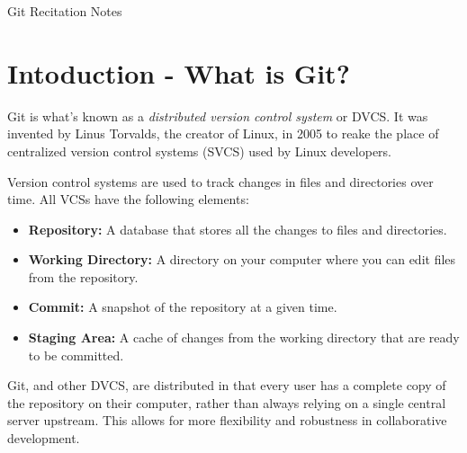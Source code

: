\documentclass[fleqn]{article}
\begin{document}
\begin{center}\LARGE Git Recitation Notes \end{center}

\section*{Intoduction - What is Git?}
Git is what's known as a \textit{distributed version control system} or DVCS.
It was invented by Linus Torvalds, the creator of Linux, in 2005 to reake the
place of centralized version control systems (SVCS) used by Linux developers.

Version control systems are used to track changes in files and directories over
time. All VCSs have the following elements:

\begin{itemize}
    \item \textbf{Repository:} A database that stores all the changes to files
                               and directories.
    \item \textbf{Working Directory:} A directory on your computer where you can
                                      edit files from the repository.
    \item \textbf{Commit:} A snapshot of the repository at a given time.
    \item \textbf{Staging Area:} A cache of changes from the working directory
                                that are ready to be committed.
\end{itemize}

Git, and other DVCS, are distributed in that every user has a complete copy of
the repository on their computer, rather than always relying on a single
central server upstream. This allows for more flexibility and robustness in
collaborative development.
\end{document}
